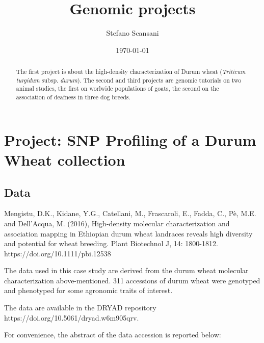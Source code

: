 \documentclass[a4paper,onecolumn,10pt]{article}
\begin{document}
\title{Genomic projects}
\author{Stefano Scansani}
\date{\today}
\maketitle
\begin{abstract}

    The first project is about the high-density characterization of Durum wheat (\textit{Triticum turgidum} subsp. \textit{durum}).
    The second and third projects are genomic tutorials on two animal studies, the first on worlwide populations of goats, the second on the association of deafness in three dog breeds.

\end{abstract}
\tableofcontents
\listoffigures
\listoftables


\section{Project: SNP Profiling of a Durum Wheat collection}

\subsection{Data}

Mengistu, D.K., Kidane, Y.G., Catellani, M., Frascaroli, E., Fadda, C., Pè, M.E. and Dell'Acqua, M. (2016), High-density molecular characterization and association mapping in Ethiopian durum wheat landraces reveals high diversity and potential for wheat breeding. Plant Biotechnol J, 14: 1800-1812. https://doi.org/10.1111/pbi.12538

The data used in this case study are derived from the durum wheat molecular characterization above-mentioned.
311 accessions of durum wheat were genotyped and phenotyped for some agronomic traits of interest.

The data are available in the DRYAD repository https://doi.org/10.5061/dryad.w6m905qrv.

For convenience, the abstract of the data accession is reported below:
\end{document}
